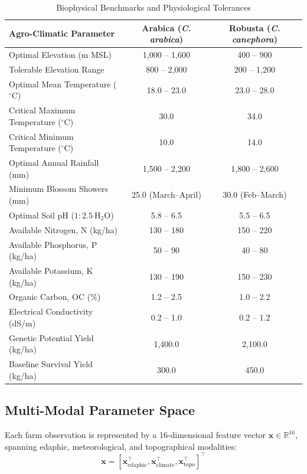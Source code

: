 \documentclass[conference]{IEEEtran}
\begin{document}
\begin{table}[htbp]
\caption{Biophysical Benchmarks and Physiological Tolerances}
\begin{center}
\begin{tabular}{lcc}
\toprule
\textbf{Agro-Climatic Parameter} & \textbf{Arabica (\textit{C. arabica})} & \textbf{Robusta (\textit{C. canephora})} \\
\midrule
Optimal Elevation (m MSL) & 1,000 -- 1,600 & 400 -- 900 \\
Tolerable Elevation Range & 800 -- 2,000 & 200 -- 1,200 \\
Optimal Mean Temperature ($^\circ\text{C}$) & 18.0 -- 23.0 & 23.0 -- 28.0 \\
Critical Maximum Temperature ($^\circ\text{C}$) & 30.0 & 34.0 \\
Critical Minimum Temperature ($^\circ\text{C}$) & 10.0 & 14.0 \\
Optimal Annual Rainfall (mm) & 1,500 -- 2,200 & 1,800 -- 2,600 \\
Minimum Blossom Showers (mm) & 25.0 (March--April) & 30.0 (Feb--March) \\
Optimal Soil pH ($1:2.5\ \text{H}_2\text{O}$) & 5.8 -- 6.5 & 5.5 -- 6.5 \\
Available Nitrogen, N (kg/ha) & 130 -- 180 & 150 -- 220 \\
Available Phosphorus, P (kg/ha) & 50 -- 90 & 40 -- 80 \\
Available Potassium, K (kg/ha) & 130 -- 190 & 150 -- 230 \\
Organic Carbon, OC (\%) & 1.2 -- 2.5 & 1.0 -- 2.2 \\
Electrical Conductivity (dS/m) & 0.2 -- 1.0 & 0.2 -- 1.2 \\
Genetic Potential Yield (kg/ha) & 1,400.0 & 2,100.0 \\
Baseline Survival Yield (kg/ha) & 300.0 & 450.0 \\
\bottomrule
\end{tabular}
\label{tab:benchmarks}
\end{center}
\end{table}

\subsection{Multi-Modal Parameter Space}
Each farm observation is represented by a 16-dimensional feature vector $\mathbf{x} \in \mathbb{R}^{16}$, spanning edaphic, meteorological, and topographical modalities:
\begin{equation}
\mathbf{x} = \left[ \mathbf{x}_{\text{edaphic}}^\top, \mathbf{x}_{\text{climate}}^\top, \mathbf{x}_{\text{topo}}^\top \right]^\top
\end{equation}
\end{document}

